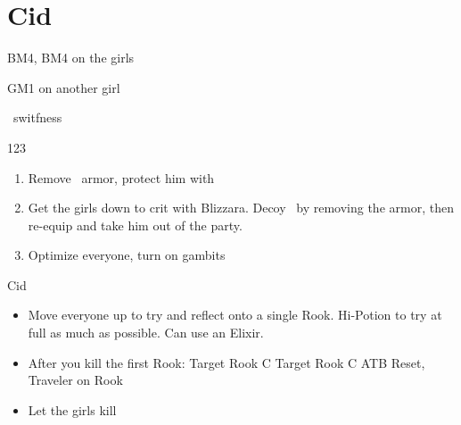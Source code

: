 \chapter{Cid}


\begin{liscense}
BM4, BM4 on the girls

GM1 on another girl

\vaan\ switfness
\end{liscense}
\begin{gambit}
\begin{itemize}
\end{itemize}
\end{gambit}
\begin{shop}{123}
\end{shop}
\begin{enumerate}
\item Remove \vaan\ armor, protect him with \penelo
\item Get the girls down to crit with Blizzara. Decoy \vaan\ by removing the armor, then re-equip and take him out of the party.
\item Optimize everyone, turn on gambits
\end{enumerate}
\begin{battle}{Cid}
\begin{itemize}
\item Move everyone up to try and reflect onto a single Rook.
\vaanf Hi-Potion to try at full as much as possible. Can use an Elixir.
\item After you kill the first Rook:
\ashef Target Rook C
\penelof Target Rook C
\vaanf ATB Reset, Traveler on Rook
\item Let the girls kill
\end{itemize}
\end{battle}